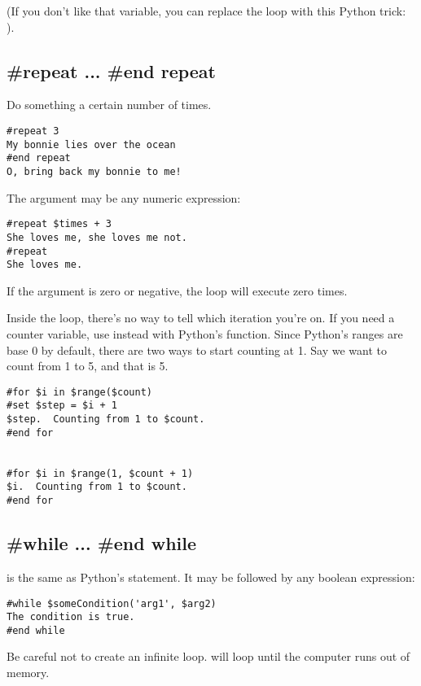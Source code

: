 (If you don't like that  variable, you can replace the
 loop with this Python trick:
).

\subsection{\#repeat ... \#end repeat}
\label{flowControl.repeat}

Do something a certain number of times.
\begin{verbatim}
#repeat 3
My bonnie lies over the ocean
#end repeat
O, bring back my bonnie to me!
\end{verbatim}

The argument may be any numeric expression:
\begin{verbatim}
#repeat $times + 3
She loves me, she loves me not.
#repeat
She loves me.
\end{verbatim}

If the argument is zero or negative, the loop will execute zero times.

Inside the loop, there's no way to tell which iteration you're on.  If you
need a counter variable, use  instead with Python's 
function.  Since Python's ranges are base 0 by default, there are two ways
to start counting at 1.  Say we want to count from 1 to 5, and that
 is 5.
\begin{verbatim}
#for $i in $range($count)
#set $step = $i + 1
$step.  Counting from 1 to $count.
#end for


#for $i in $range(1, $count + 1)
$i.  Counting from 1 to $count.
#end for
\end{verbatim}


\subsection{\#while ... \#end while}
\label{flowControl.while}

 is the same as Python's  statement.  It may be
followed by any boolean expression:
\begin{verbatim}
#while $someCondition('arg1', $arg2)
The condition is true.
#end while
\end{verbatim}

Be careful not to create an infinite loop.   will loop until
the computer runs out of memory.

